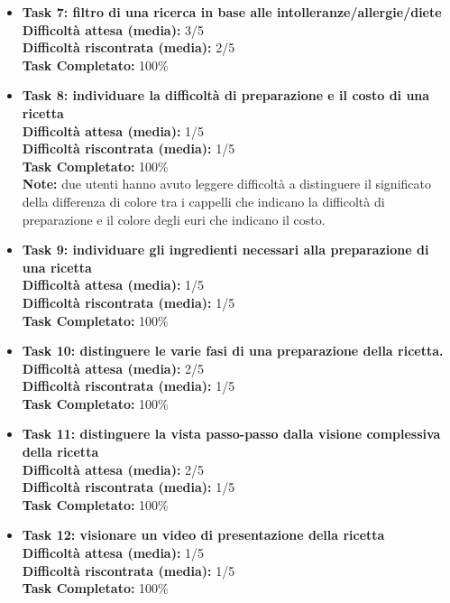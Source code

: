 \begin{itemize}
\item
\textbf{Task 7: filtro di una ricerca in base alle intolleranze/allergie/diete}\\
\textbf{Difficoltà attesa (media):} 3/5\\
\textbf{Difficoltà riscontrata (media):} 2/5\\
\textbf{Task Completato:} 100\%\\

\item
\textbf{Task 8: individuare la difficoltà di preparazione e il costo di una ricetta}\\
\textbf{Difficoltà attesa (media):} 1/5\\
\textbf{Difficoltà riscontrata (media):} 1/5\\
\textbf{Task Completato:} 100\%\\
\textbf{Note:} due utenti hanno avuto leggere difficoltà a distinguere
il significato della differenza di colore tra i cappelli che indicano la
difficoltà di preparazione e il colore degli euri che indicano il
costo.

\item
\textbf{Task 9: individuare gli ingredienti necessari alla preparazione
di una ricetta}\\
\textbf{Difficoltà attesa (media):} 1/5\\
\textbf{Difficoltà riscontrata (media):} 1/5\\
\textbf{Task Completato:} 100\%\\

\item
\textbf{Task 10: distinguere le varie fasi di una preparazione della
ricetta.}\\
\textbf{Difficoltà attesa (media):} 2/5\\
\textbf{Difficoltà riscontrata (media):} 1/5\\
\textbf{Task Completato:} 100\%\\

\item
\textbf{Task 11: distinguere la vista passo-passo dalla visione
complessiva della ricetta}\\
\textbf{Difficoltà attesa (media):} 2/5\\
\textbf{Difficoltà riscontrata (media):} 1/5\\
\textbf{Task Completato:} 100\%\\

\item
\textbf{Task 12: visionare un video di presentazione della ricetta}\\
\textbf{Difficoltà attesa (media):} 1/5\\
\textbf{Difficoltà riscontrata (media):} 1/5\\
\textbf{Task Completato:} 100\%\\


\end{itemize}
